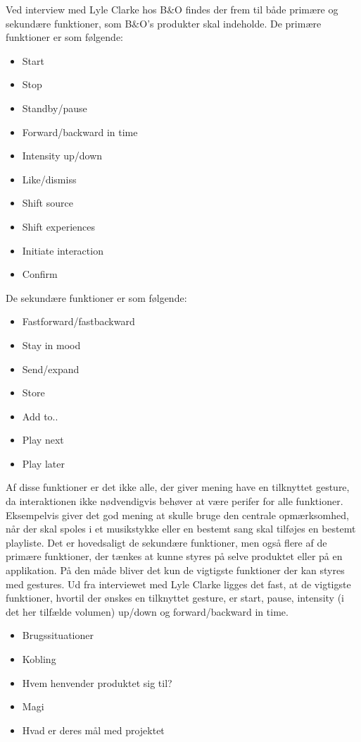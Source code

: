 Ved interview med Lyle Clarke hos B$\&$O findes der frem til både primære og sekundære funktioner, som B$\&$O's produkter skal indeholde. De primære funktioner er som følgende:

\begin{itemize}
	\item Start
	\item Stop
	\item Standby/pause
	\item Forward/backward in time
	\item Intensity up/down
	\item Like/dismiss
	\item Shift source
	\item Shift experiences
	\item Initiate interaction
	\item Confirm
\end{itemize}

De sekundære funktioner er som følgende:

\begin{itemize}
	\item Fastforward/fastbackward
	\item Stay in mood
	\item Send/expand
	\item Store
	\item Add to..
	\item Play next
	\item Play later
\end{itemize}

Af disse funktioner er det ikke alle, der giver mening have en tilknyttet gesture, da interaktionen ikke nødvendigvis behøver at være perifer for alle funktioner. Eksempelvis giver det god mening at skulle bruge den centrale opmærksomhed, når der skal spoles i et musikstykke eller en bestemt sang skal tilføjes en bestemt playliste. Det er hovedsaligt de sekundære funktioner, men også flere af de primære funktioner, der tænkes at kunne styres på selve produktet eller på en applikation. På den måde bliver det kun de vigtigste funktioner der kan styres med gestures. Ud fra interviewet med Lyle Clarke ligges det fast, at de vigtigste funktioner, hvortil der ønskes en tilknyttet gesture, er start, pause, intensity (i det her tilfælde volumen) up/down og forward/backward in time. 

\begin{itemize}
  \item Brugssituationer 
  \item Kobling
  \item Hvem henvender produktet sig til?
  \item Magi
  \item Hvad er deres mål med projektet
\end{itemize}

